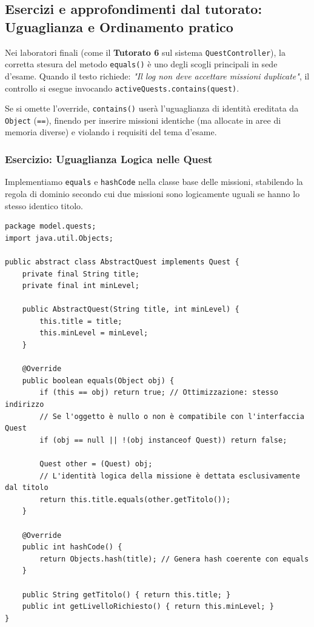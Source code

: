 \documentclass[12pt, a4paper]{article}
\begin{document}
\newpage

\subsection{Esercizi e approfondimenti dal tutorato: Uguaglianza e Ordinamento pratico}
Nei laboratori finali (come il \textbf{Tutorato 6} sul sistema \texttt{QuestController}), la corretta stesura del metodo \texttt{equals()} è uno degli scogli principali in sede d'esame. Quando il testo richiede: \textit{"Il log non deve accettare missioni duplicate"}, il controllo si esegue invocando \texttt{activeQuests.contains(quest)}. 

Se si omette l'override, \texttt{contains()} userà l'uguaglianza di identità ereditata da \texttt{Object} (\texttt{==}), finendo per inserire missioni identiche (ma allocate in aree di memoria diverse) e violando i requisiti del tema d'esame.

\subsubsection{Esercizio: Uguaglianza Logica nelle Quest}
Implementiamo \texttt{equals} e \texttt{hashCode} nella classe base delle missioni, stabilendo la regola di dominio secondo cui due missioni sono logicamente uguali se hanno lo stesso identico titolo.

\begin{verbatim}
package model.quests;
import java.util.Objects;

public abstract class AbstractQuest implements Quest {
    private final String title;
    private final int minLevel;

    public AbstractQuest(String title, int minLevel) {
        this.title = title;
        this.minLevel = minLevel;
    }

    @Override
    public boolean equals(Object obj) {
        if (this == obj) return true; // Ottimizzazione: stesso indirizzo
        // Se l'oggetto è nullo o non è compatibile con l'interfaccia Quest
        if (obj == null || !(obj instanceof Quest)) return false;
        
        Quest other = (Quest) obj;
        // L'identità logica della missione è dettata esclusivamente dal titolo
        return this.title.equals(other.getTitolo());
    }

    @Override
    public int hashCode() {
        return Objects.hash(title); // Genera hash coerente con equals
    }
    
    public String getTitolo() { return this.title; }
    public int getLivelloRichiesto() { return this.minLevel; }
}
\end{verbatim}
\end{document}

